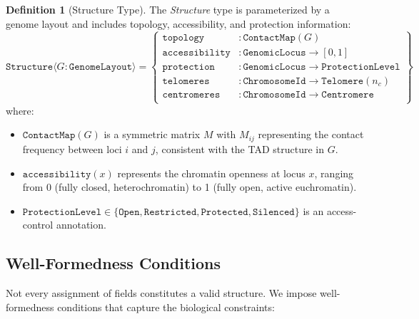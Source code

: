 \documentclass[12pt,a4paper]{article}
\theoremstyle{plain}
\theoremstyle{definition}
\newtheorem{definition}[theorem]{Definition}
\begin{document}
\begin{definition}[Structure Type]\label{def:structure-type}
The \emph{Structure} type is parameterized by a genome layout and includes topology, accessibility, and protection information:
\[
  \texttt{Structure}\langle G : \texttt{GenomeLayout} \rangle = \left\{
    \begin{array}{ll}
      \texttt{topology} &: \texttt{ContactMap}(G) \\
      \texttt{accessibility} &: \texttt{GenomicLocus} \to [0,1] \\
      \texttt{protection} &: \texttt{GenomicLocus} \to \texttt{ProtectionLevel} \\
      \texttt{telomeres} &: \texttt{ChromosomeId} \to \texttt{Telomere}(n_c) \\
      \texttt{centromeres} &: \texttt{ChromosomeId} \to \texttt{Centromere} \\
    \end{array}
  \right\}
\]
where:
\begin{itemize}
  \item $\texttt{ContactMap}(G)$ is a symmetric matrix $M$ with $M_{ij}$ representing the contact frequency between loci $i$ and $j$, consistent with the TAD structure in $G$.
  \item $\texttt{accessibility}(x)$ represents the chromatin openness at locus $x$, ranging from 0 (fully closed, heterochromatin) to 1 (fully open, active euchromatin).
  \item $\texttt{ProtectionLevel} \in \{\texttt{Open}, \texttt{Restricted}, \texttt{Protected}, \texttt{Silenced}\}$ is an access-control annotation.
\end{itemize}
\end{definition}

\subsection{Well-Formedness Conditions}

Not every assignment of fields constitutes a valid structure. We impose well-formedness conditions that capture the biological constraints:
\end{document}
